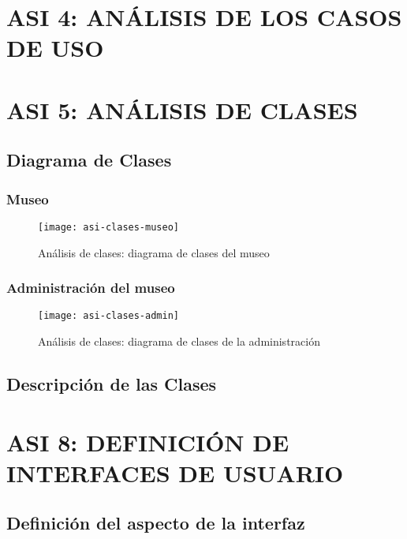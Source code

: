 \newpage
\section{ASI 4: ANÁLISIS DE LOS CASOS DE USO}



\newpage
\section{ASI 5: ANÁLISIS DE CLASES}

\subsection{Diagrama de Clases} 
\subsubsection{Museo}
\begin{figure}[H]
\centering
\centerline{\texttt{[image: asi-clases-museo]}}
\caption{Análisis de clases: diagrama de clases del museo}
\end{figure}
\subsubsection{Administración del museo}
\begin{figure}[H]
\centering
\centerline{\texttt{[image: asi-clases-admin]}}
\caption{Análisis de clases: diagrama de clases de la administración}
\end{figure}

\subsection{Descripción de las Clases}




\newpage
\section{ASI 8: DEFINICIÓN DE INTERFACES DE USUARIO}


\subsection{Definición del aspecto de la interfaz}

